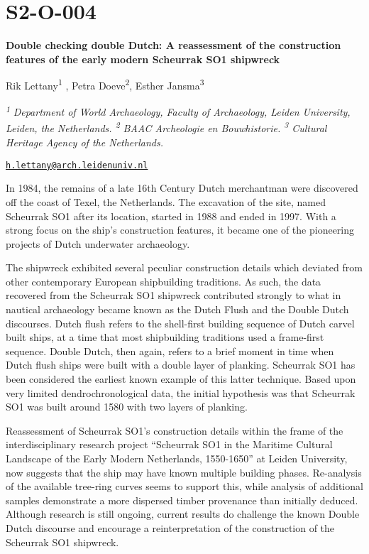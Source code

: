 \documentclass[
]{book}
\begin{document}
\hypertarget{s2-o-004}{%
\section*{S2-O-004}\label{s2-o-004}}

\textbf{Double checking double Dutch: A reassessment of the construction features of the early modern Scheurrak SO1 shipwreck}

Rik Lettany\textsuperscript{1} , Petra Doeve\textsuperscript{2}, Esther Jansma\textsuperscript{3}

\textsuperscript{\emph{1}} \emph{Department of World Archaeology, Faculty of Archaeology, Leiden University, Leiden, the Netherlands. \textsuperscript{2} BAAC Archeologie en Bouwhistorie. \textsuperscript{3} Cultural Heritage Agency of the Netherlands.}

\href{mailto:h.lettany@arch.leidenuniv.nl}{\nolinkurl{h.lettany@arch.leidenuniv.nl}}

In 1984, the remains of a late 16th Century Dutch merchantman were discovered off the coast of Texel, the Netherlands. The excavation of the site, named Scheurrak SO1 after its location, started in 1988 and ended in 1997. With a strong focus on the ship's construction features, it became one of the pioneering projects of Dutch underwater archaeology.

The shipwreck exhibited several peculiar construction details which deviated from other contemporary European shipbuilding traditions. As such, the data recovered from the Scheurrak SO1 shipwreck contributed strongly to what in nautical archaeology became known as the Dutch Flush and the Double Dutch discourses. Dutch flush refers to the shell-first building sequence of Dutch carvel built ships, at a time that most shipbuilding traditions used a frame-first sequence. Double Dutch, then again, refers to a brief moment in time when Dutch flush ships were built with a double layer of planking. Scheurrak SO1 has been considered the earliest known example of this latter technique. Based upon very limited dendrochronological data, the initial hypothesis was that Scheurrak SO1 was built around 1580 with two layers of planking.

Reassessment of Scheurrak SO1's construction details within the frame of the interdisciplinary research project ``Scheurrak SO1 in the Maritime Cultural Landscape of the Early Modern Netherlands, 1550-1650'' at Leiden University, now suggests that the ship may have known multiple building phases. Re-analysis of the available tree-ring curves seems to support this, while analysis of additional samples demonstrate a more dispersed timber provenance than initially deduced. Although research is still ongoing, current results do challenge the known Double Dutch discourse and encourage a reinterpretation of the construction of the Scheurrak SO1 shipwreck.
\end{document}
